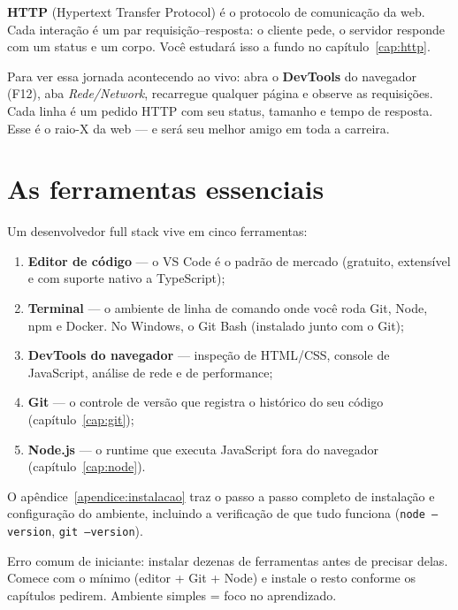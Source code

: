 \begin{caixaconceito}
\textbf{HTTP} (Hypertext Transfer Protocol) é o protocolo de comunicação da
web. Cada interação é um par requisição--resposta: o cliente pede, o servidor
responde com um status e um corpo. Você estudará isso a fundo no
capítulo~\ref{cap:http}.
\end{caixaconceito}

\begin{caixadica}
Para ver essa jornada acontecendo ao vivo: abra o \textbf{DevTools} do
navegador (F12), aba \emph{Rede/Network}, recarregue qualquer página e observe
as requisições. Cada linha é um pedido HTTP com seu status, tamanho e tempo de
resposta. Esse é o raio-X da web — e será seu melhor amigo em toda a carreira.
\end{caixadica}

\section{As ferramentas essenciais}

Um desenvolvedor full stack vive em cinco ferramentas:

\begin{enumerate}[leftmargin=*, itemsep=0.4em]
  \item \textbf{Editor de código} — o VS Code é o padrão de mercado
  (gratuito, extensível e com suporte nativo a TypeScript);
  \item \textbf{Terminal} — o ambiente de linha de comando onde você roda
  Git, Node, npm e Docker. No Windows, o Git Bash (instalado junto com o Git);
  \item \textbf{DevTools do navegador} — inspeção de HTML/CSS, console de
  JavaScript, análise de rede e de performance;
  \item \textbf{Git} — o controle de versão que registra o histórico do seu
  código (capítulo~\ref{cap:git});
  \item \textbf{Node.js} — o runtime que executa JavaScript fora do navegador
  (capítulo~\ref{cap:node}).
\end{enumerate}

O apêndice~\ref{apendice:instalacao} traz o passo a passo completo de
instalação e configuração do ambiente, incluindo a verificação de que tudo
funciona (\texttt{node --version}, \texttt{git --version}).

\begin{caixaarmadilha}
Erro comum de iniciante: instalar dezenas de ferramentas antes de precisar
delas. Comece com o mínimo (editor + Git + Node) e instale o resto conforme os
capítulos pedirem. Ambiente simples = foco no aprendizado.
\end{caixaarmadilha}

